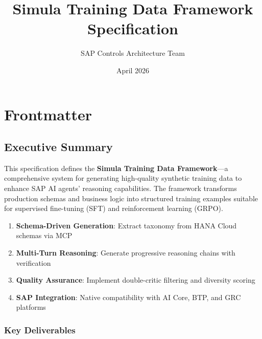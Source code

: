 \documentclass[12pt,a4paper,twoside]{report}
\title{Simula Training Data Framework Specification}
\author{SAP Controls Architecture Team}
\date{April 2026}
\begin{document}
\maketitle


\chapter*{Frontmatter}

\section*{Executive Summary}

This specification defines the \textbf{Simula Training Data Framework}—a comprehensive system for generating high-quality synthetic training data to enhance SAP AI agents' reasoning capabilities. The framework transforms production schemas and business logic into structured training examples suitable for supervised fine-tuning (SFT) and reinforcement learning (GRPO).

\begin{tcolorbox}[colback=sapblue!10,colframe=sapblue,title=\faIcon{bullseye} Primary Objectives]
\begin{enumerate}[leftmargin=*]
\item \textbf{Schema-Driven Generation}: Extract taxonomy from HANA Cloud schemas via MCP
\item \textbf{Multi-Turn Reasoning}: Generate progressive reasoning chains with verification
\item \textbf{Quality Assurance}: Implement double-critic filtering and diversity scoring
\item \textbf{SAP Integration}: Native compatibility with AI Core, BTP, and GRC platforms
\end{enumerate}
\end{tcolorbox}

\subsection*{Key Deliverables}
\end{document}

